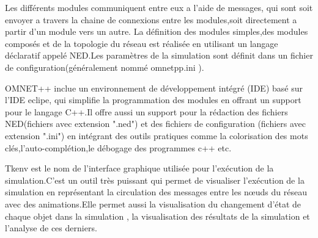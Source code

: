 Les différents modules communiquent entre eux a l'aide de messages, qui sont soit envoyer a travers la chaine de connexions entre les modules,soit  directement a partir d'un module vers un autre.
La définition des modules simples,des modules composés et de la topologie du réseau est réalisée en utilisant un langage déclaratif appelé NED.Les paramètres de la simulation sont définit dans un fichier de configuration(généralement nommé omnetpp.ini ).

OMNET++ inclue un environnement de développement intégré (IDE) basé sur l'IDE eclipe, qui simplifie  la programmation des modules en offrant un support pour le langage C++.Il offre aussi un support pour la rédaction des fichiers NED(fichiers avec extension ".ned") et des fichiers de configuration (fichiers avec extension ".ini") en intégrant des outils pratiques comme la colorisation des mots clés,l'auto-complétion,le débogage des programmes c++ etc.

Tkenv est le nom de l'interface graphique utilisée pour l'exécution de la simulation.C'est un outil très puissant qui permet de visualiser  l'exécution de la simulation en représentant la circulation des messages entre les nœuds du réseau avec des animations.Elle permet aussi la visualisation du changement d'état de chaque objet dans la simulation , la visualisation des résultats de la simulation et l'analyse de ces derniers.

